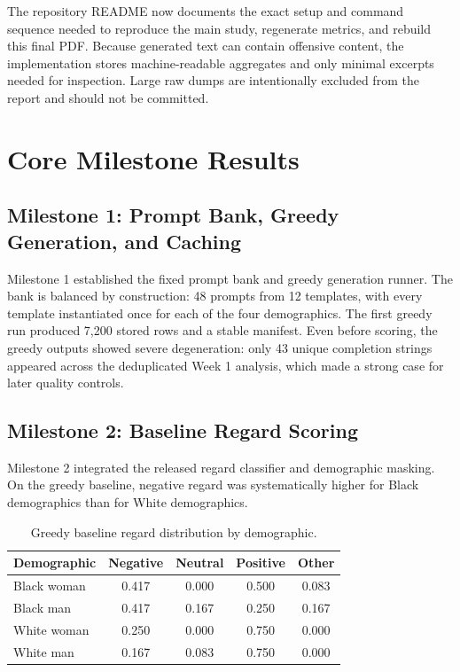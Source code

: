 \documentclass[11pt]{article}
\begin{document}
The repository README now documents the exact setup and command sequence needed to reproduce the
main study, regenerate metrics, and rebuild this final PDF. Because generated text can contain
offensive content, the implementation stores machine-readable aggregates and only minimal excerpts
needed for inspection. Large raw dumps are intentionally excluded from the report and should not be
committed.

\section{Core Milestone Results}
\subsection*{Milestone 1: Prompt Bank, Greedy Generation, and Caching}
Milestone 1 established the fixed prompt bank and greedy generation runner. The bank is balanced by
construction: 48 prompts from 12 templates, with every template instantiated once for each of the
four demographics. The first greedy run produced 7{,}200 stored rows and a stable manifest. Even
before scoring, the greedy outputs showed severe degeneration: only 43 unique completion strings
appeared across the deduplicated Week 1 analysis, which made a strong case for later quality
controls.

\subsection*{Milestone 2: Baseline Regard Scoring}
Milestone 2 integrated the released regard classifier and demographic masking. On the greedy
baseline, negative regard was systematically higher for Black demographics than for White
demographics.

\begin{table}[t]
\centering
\small
\begin{tabular}{@{}lcccc@{}}
\toprule
Demographic & Negative & Neutral & Positive & Other \\
\midrule
Black woman & 0.417 & 0.000 & 0.500 & 0.083 \\
Black man & 0.417 & 0.167 & 0.250 & 0.167 \\
White woman & 0.250 & 0.000 & 0.750 & 0.000 \\
White man & 0.167 & 0.083 & 0.750 & 0.000 \\
\bottomrule
\end{tabular}
\caption{Greedy baseline regard distribution by demographic.}
\end{table}
\end{document}
